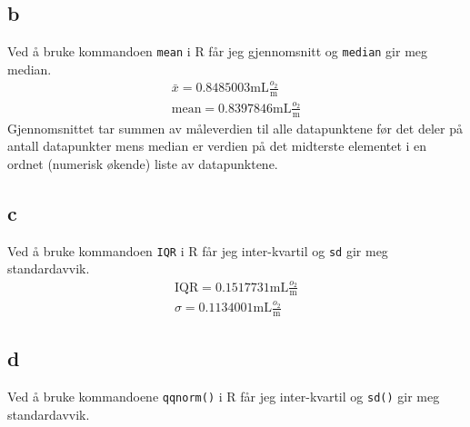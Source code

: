 \subsection*{b}

Ved å bruke kommandoen \texttt{mean} i R får jeg gjennomsnitt og \texttt{median} gir meg median.
\begin{align*}
    \bar{x} = 0.8485003\mathrm{mL}\frac{o_2}{\mathrm{m}}\\
    \mathrm{mean} = 0.8397846\mathrm{mL}\frac{o_2}{\mathrm{m}}
\end{align*}
Gjennomsnittet tar summen av måleverdien til alle datapunktene før det deler på antall datapunkter mens median er verdien på det midterste elementet i en ordnet (numerisk økende) liste av datapunktene.

\subsection*{c}

Ved å bruke kommandoen \texttt{IQR} i R får jeg inter-kvartil og \texttt{sd} gir meg standardavvik.
\begin{align*}
    \mathrm{IQR} = 0.1517731\mathrm{mL}\frac{o_2}{\mathrm{m}}\\
    \sigma = 0.1134001\mathrm{mL}\frac{o_2}{\mathrm{m}}
\end{align*}

\subsection*{d}
Ved å bruke kommandoene \texttt{qqnorm()} i R får jeg inter-kvartil og \texttt{sd()} gir meg standardavvik.

